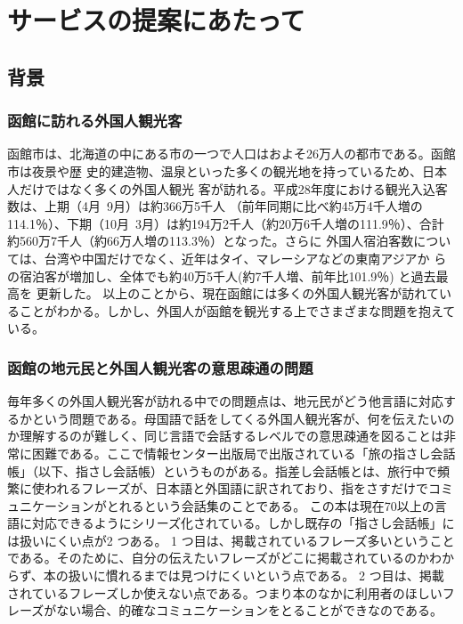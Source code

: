 \documentclass[openany,11pt,papersize]{jsbook}
\begin{document}
\tableofcontents%


\mainmatter%




\chapter{サービスの提案にあたって}

\section{背景}

\subsection{函館に訪れる外国人観光客}
 函館市は、北海道の中にある市の一つで人口はおよそ26万人の都市である。函館市は夜景や歴
史的建造物、温泉といった多くの観光地を持っているため、日本人だけではなく多くの外国人観光
客が訪れる。平成28年度における観光入込客数は、上期（4月~9月）は約366万5千人
（前年同期に比べ約45万4千人増の114.1％）、下期（10月~3月）は約194万2千人（約20万6千人増の111.9％）、合計約560万7千人（約66万人増の113.3％）となった。さらに
外国人宿泊客数については、台湾や中国だけでなく、近年はタイ、マレーシアなどの東南アジアか
らの宿泊客が増加し、全体でも約40万5千人(約7千人増、前年比101.9％) と過去最高を
更新した\cite{b}。
以上のことから、現在函館には多くの外国人観光客が訪れていることがわかる。しかし、外国人が函館を観光する上でさまざまな問題を抱えている。

\subsection{函館の地元民と外国人観光客の意思疎通の問題}\label{sec:mokuteki}
 毎年多くの外国人観光客が訪れる中での問題点は、地元民がどう他言語に対応するかという問題である。母国語で話をしてくる外国人観光客が、何を伝えたいのか理解するのが難しく、同じ言語で会話するレベルでの意思疎通を図ることは非常に困難である。ここで情報センター出版局で出版されている「旅の指さし会話帳」（以下、指さし会話帳）というものがある。指差し会話帳とは、旅行中で頻繁に使われるフレーズが、日本語と外国語に訳されており、指をさすだけでコミュニケーションがとれるという会話集のことである。
この本は現在70以上の言語に対応できるようにシリーズ化されている。しかし既存の「指さし会話帳」には扱いにくい点が2 つある。
1 つ目は、掲載されているフレーズ多いということである。そのために、自分の伝えたいフレーズがどこに掲載されているのかわからず、本の扱いに慣れるまでは見つけにくいという点である。
2 つ目は、掲載されているフレーズしか使えない点である。つまり本のなかに利用者のほしいフレーズがない場合、的確なコミュニケーションをとることができなのである。
\end{document}
